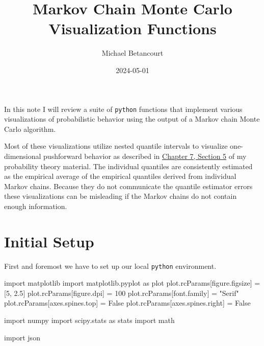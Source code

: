\documentclass[
  letterpaper,
  DIV=11,
  numbers=noendperiod]{scrartcl}
\title{Markov Chain Monte Carlo Visualization Functions}
\author{Michael Betancourt}
\date{2024-05-01}
\newenvironment{Shaded}{\begin{snugshade}}{\end{snugshade}}
\newcommand{\DecValTok}[1]{\textcolor[rgb]{0.68,0.00,0.00}{#1}}
\newcommand{\FloatTok}[1]{\textcolor[rgb]{0.68,0.00,0.00}{#1}}
\newcommand{\ImportTok}[1]{\textcolor[rgb]{0.00,0.46,0.62}{#1}}
\newcommand{\NormalTok}[1]{\textcolor[rgb]{0.00,0.23,0.31}{#1}}
\newcommand{\OperatorTok}[1]{\textcolor[rgb]{0.37,0.37,0.37}{#1}}
\newcommand{\StringTok}[1]{\textcolor[rgb]{0.13,0.47,0.30}{#1}}
\newcommand{\VariableTok}[1]{\textcolor[rgb]{0.07,0.07,0.07}{#1}}
\renewcommand*\contentsname{Table of contents}
\newcommand\contentsname{Table of contents}
\begin{document}
\maketitle

\renewcommand*\contentsname{Table of contents}
{
\hypersetup{linkcolor=}
\setcounter{tocdepth}{3}
\tableofcontents
}
In this note I will review a suite of \texttt{python} functions that
implement various visualizations of probabilistic behavior using the
output of a Markov chain Monte Carlo algorithm.

Most of these visualizations utilize nested quantile intervals to
visualize one-dimensional pushforward behavior as described in
\href{https://betanalpha.github.io/assets/chapters_html/transforming_probability_spaces.html\#sec:1d-pushforward-characterizations}{Chapter
7, Section 5} of my probability theory material. The individual
quantiles are consistently estimated as the empirical average of the
empirical quantiles derived from individual Markov chains. Because they
do not communicate the quantile estimator errors these visualizations
can be misleading if the Markov chains do not contain enough
information.

\section{Initial Setup}\label{initial-setup}

First and foremost we have to set up our local \texttt{python}
environment.

\begin{Shaded}
\begin{Highlighting}[]
\ImportTok{import}\NormalTok{ matplotlib}
\ImportTok{import}\NormalTok{ matplotlib.pyplot }\ImportTok{as}\NormalTok{ plot}
\NormalTok{plot.rcParams[}\StringTok{\textquotesingle{}figure.figsize\textquotesingle{}}\NormalTok{] }\OperatorTok{=}\NormalTok{ [}\DecValTok{5}\NormalTok{, }\FloatTok{2.5}\NormalTok{]}
\NormalTok{plot.rcParams[}\StringTok{\textquotesingle{}figure.dpi\textquotesingle{}}\NormalTok{] }\OperatorTok{=} \DecValTok{100}
\NormalTok{plot.rcParams[}\StringTok{\textquotesingle{}font.family\textquotesingle{}}\NormalTok{] }\OperatorTok{=} \StringTok{"Serif"}
\NormalTok{plot.rcParams[}\StringTok{\textquotesingle{}axes.spines.top\textquotesingle{}}\NormalTok{] }\OperatorTok{=} \VariableTok{False}
\NormalTok{plot.rcParams[}\StringTok{\textquotesingle{}axes.spines.right\textquotesingle{}}\NormalTok{] }\OperatorTok{=} \VariableTok{False}

\ImportTok{import}\NormalTok{ numpy}
\ImportTok{import}\NormalTok{ scipy.stats }\ImportTok{as}\NormalTok{ stats}
\ImportTok{import}\NormalTok{ math}

\ImportTok{import}\NormalTok{ json}
\end{Highlighting}
\end{Shaded}
\end{document}
